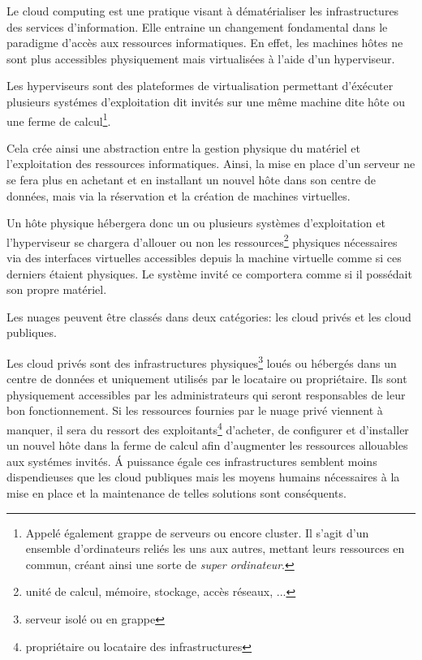\documentclass[11pt, a4paper ]{article}
\begin{document}
\begin{spacing}{1.5}
Le cloud computing\cite{cloudDef} est une pratique visant à dématérialiser les infrastructures des services d'information. Elle entraine un changement fondamental dans le paradigme d'accès aux ressources informatiques. En effet, les machines hôtes ne sont plus accessibles physiquement mais virtualisées à l'aide d'un hyperviseur.

Les hyperviseurs sont des plateformes de virtualisation permettant d'éxécuter plusieurs systémes d'exploitation dit invités sur une même machine dite hôte ou une ferme de calcul\footnote{Appelé également grappe de serveurs ou encore cluster. Il s'agit d'un ensemble d'ordinateurs reliés les uns aux autres, mettant leurs ressources en commun, créant ainsi une sorte de \emph{super ordinateur}. }.

Cela crée ainsi une abstraction entre la gestion physique du matériel et l'exploitation des ressources informatiques. Ainsi, la mise en place d'un serveur ne se fera plus en achetant et en installant un nouvel hôte dans son centre de données, mais via la réservation et la création de machines virtuelles.

Un hôte physique hébergera donc un ou plusieurs systèmes d'exploitation et l'hyperviseur se chargera d'allouer ou non les ressources\footnote{unité de calcul, mémoire, stockage, accès réseaux, ...}  physiques nécessaires via des interfaces virtuelles accessibles depuis la machine virtuelle comme si ces derniers étaient physiques. Le système invité ce comportera comme si il possédait son propre matériel.

Les nuages peuvent être classés dans deux catégories: les cloud privés et les cloud publiques.


Les cloud privés sont des infrastructures physiques\footnote{serveur isolé ou en grappe} loués ou hébergés dans un centre de données et uniquement utilisés par le locataire ou propriétaire. Ils sont physiquement accessibles par les administrateurs qui seront responsables de leur bon fonctionnement. Si les ressources fournies par le nuage privé viennent à manquer, il sera du ressort des exploitants\footnote{propriétaire ou locataire des infrastructures} d'acheter, de configurer et d'installer un nouvel hôte dans la ferme de calcul afin d'augmenter les ressources allouables aux systémes invités. Á puissance égale ces infrastructures semblent moins dispendieuses que les cloud publiques mais les moyens humains nécessaires à la mise en place et la maintenance de telles solutions sont conséquents.


\end{spacing}
\end{document}

